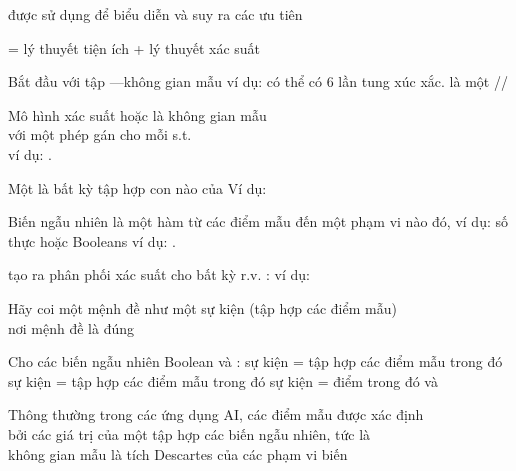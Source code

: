 \documentclass{article}
\begin{document}
\begin{huge}
 được sử dụng để biểu diễn và suy ra các ưu tiên

 = lý thuyết tiện ích + lý thuyết xác suất




Bắt đầu với tập \mat{$\Omega$}---không gian mẫu \al
ví dụ: có thể có 6 lần tung xúc xắc.\al
\mat{$\omega\in \Omega$} là một //

Mô hình xác suất  hoặc  là không gian mẫu\\
với một phép gán  cho mỗi \mat{$\omega\in\Omega$} s.t.\al
  \al
  \\
ví dụ: .

Một   là bất kỳ tập hợp con nào của \mat{$\Omega$}
\mat{\[
  P(A) = \mysum_{\{\omega\in A\}} P(\omega)
\]}
Ví dụ: 



Biến ngẫu nhiên  là một hàm từ các điểm mẫu
đến một phạm vi nào đó, ví dụ: số thực hoặc Booleans\al
ví dụ: .

 tạo ra phân phối xác suất  cho bất kỳ r.v. :
\mat{\[
  P(X\eq x_i) = \mysum_{\{\omega: X(\omega)\eq x_i\}} P(\omega)
\]}
ví dụ: 


Hãy coi một mệnh đề như một sự kiện (tập hợp các điểm mẫu)\\
nơi mệnh đề là đúng

Cho các biến ngẫu nhiên Boolean  và :\al
  sự kiện  = tập hợp các điểm mẫu trong đó \al
  sự kiện  = tập hợp các điểm mẫu trong đó \al
  sự kiện  = điểm trong đó  và 

Thông thường trong các ứng dụng AI, các điểm mẫu được xác định \emph{}\\
bởi các giá trị của một tập hợp các biến ngẫu nhiên, tức là \\
không gian mẫu là tích Descartes của các phạm vi biến


\end{huge}
\end{document}
